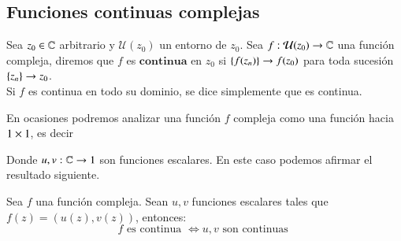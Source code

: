     \subsection{Funciones continuas complejas}
    \begin{dfn}
        Sea $z_0 \in \mathbb{C}$ arbitrario y $\mathcal{U}(z_0)$ un entorno de $z_0$. Sea $f: \mathcal{U}(z_0) \to \mathbb{C}$ una función compleja, diremos que $f$ es $\mathbf{continua}$ en $z_0$ si $\left\{f(z_n)\right\} \to f(z_0)$ para toda sucesión $\left\{z_n\right\} \to z_0$.\\

        Si $f$ es continua en todo su dominio, se dice simplemente que es continua.
    \end{dfn}

    En ocasiones podremos analizar una función $f$ compleja como una función hacia $1 \times 1$, es decir\\


    Donde $u, v: \mathbb{C} \to 1$ son funciones escalares. En este caso podemos afirmar el resultado siguiente.
    \begin{pro}
        Sea $f$ una función compleja. Sean $u, v$ funciones escalares tales que $f(z) = (u(z), v(z))$, entonces:
        $$
            f \text{ es continua } \iff u, v \text{ son continuas }
        $$
    \end{pro}

